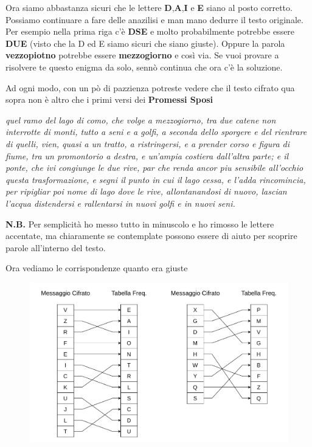 \documentclass{report}
\begin{document}
Ora siamo abbastanza sicuri che le lettere \textbf{D},\textbf{A},\textbf{I} e \textbf{E} siano al posto corretto. Possiamo continuare a fare delle anazilisi e man mano dedurre il testo originale. Per esempio nella prima riga c'è \textbf{DSE} e molto probabilmente potrebbe essere \textbf{DUE} (visto che la D ed E siamo sicuri che siano giuste). Oppure la parola \textbf{vezzopiotno} potrebbe essere \textbf{mezzogiorno} e così via.
Se vuoi provare a risolvere te questo enigma da solo, sennò continua che ora c'è la soluzione.

\newpage
Ad ogni modo, con un pò di pazzienza potreste vedere che il testo cifrato qua sopra non è altro che i primi versi dei \textbf{Promessi Sposi}

\vspace{0.2cm}
\textit{quel ramo del lago di como, che volge a mezzogiorno, tra due catene non interrotte di monti, tutto a seni e a golfi, a seconda dello sporgere e del rientrare di quelli, vien, quasi a un tratto, a ristringersi, e a prender corso e figura di fiume, tra un promontorio a destra, e un’ampia costiera dall’altra parte; e il ponte, che ivi congiunge le due rive, par che renda ancor piu sensibile all’occhio questa trasformazione, e segni il punto in cui il lago cessa, e l’adda rincomincia, per ripigliar poi nome di lago dove le rive, allontanandosi di nuovo, lascian l’acqua distendersi e rallentarsi in nuovi golfi e in nuovi seni. }
\vspace{0.2cm}


\textbf{N.B.} Per semplicità ho messo tutto in minuscolo e ho rimosso le lettere accentate, ma chiaramente se contemplate possono essere di aiuto per scoprire parole all'interno del testo.
\vspace{0.2cm}

Ora vediamo le corrispondenze quanto era giuste

\begin{figure}[h]

    \centering
    \includegraphics[width=\linewidth]{logos/1_5_cripto.pdf}

\end{figure}
\end{document}
